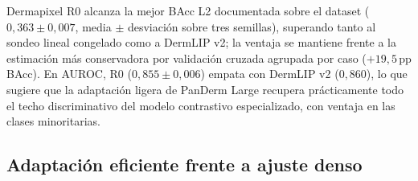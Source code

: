 \begin{table}[H]
\centering
\footnotesize
\setlength{\tabcolsep}{4pt}
\renewcommand{\arraystretch}{0.95}
\caption{Comparativa sobre el nivel L2 de DermapixelAI~1.0
($38$ clases con queratinización consolidada,
$N_{\mathrm{test}} = 36$) entre Dermapixel R0 y las referencias
internas del trabajo. La fila LP CV se considera la cifra honesta
del sondeo lineal congelado por su independencia del \emph{split}
fijo y por su anclaje en validación cruzada agrupada por caso
(sección~\ref{sec:dermapixel-results}). Mejor valor por
columna en negrita.}
\label{tab:dermapixel-spanderm-comp}
\end{table}

Dermapixel R0 alcanza la mejor BAcc L2 documentada sobre el dataset
($0{,}363 \pm 0{,}007$, media $\pm$ desviación sobre tres semillas),
superando tanto al sondeo lineal congelado como a DermLIP v2; la
ventaja se mantiene frente a la estimación más conservadora por
validación cruzada agrupada por caso ($+19{,}5$\,pp BAcc). En AUROC,
R0 ($0{,}855 \pm 0{,}006$) empata con DermLIP v2 ($0{,}860$), lo que
sugiere que la adaptación ligera de PanDerm Large recupera
prácticamente todo el techo discriminativo del modelo contrastivo
especializado, con ventaja en las clases minoritarias.

\subsection{Adaptación eficiente frente a ajuste denso}

